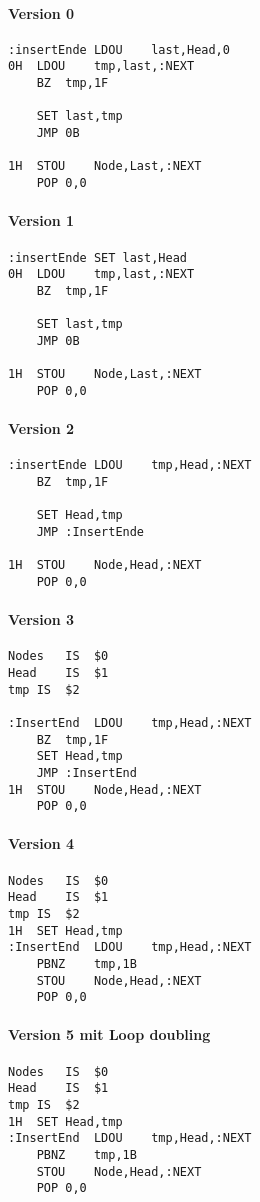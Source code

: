 \paragraph{Version 0}
\begin{lstlisting}
:insertEnde LDOU	last,Head,0
0H	LDOU	tmp,last,:NEXT
	BZ	tmp,1F
	
	SET	last,tmp
	JMP	0B
	
1H	STOU	Node,Last,:NEXT
	POP	0,0	
\end{lstlisting}

\paragraph{Version 1}
\begin{lstlisting}
:insertEnde SET	last,Head
0H	LDOU	tmp,last,:NEXT
	BZ	tmp,1F
	
	SET	last,tmp
	JMP	0B
	
1H	STOU	Node,Last,:NEXT
	POP	0,0	
\end{lstlisting}

\paragraph{Version 2}
\begin{lstlisting}
:insertEnde	LDOU	tmp,Head,:NEXT
	BZ	tmp,1F
	
	SET	Head,tmp
	JMP	:InsertEnde
	
1H	STOU	Node,Head,:NEXT
	POP	0,0	
\end{lstlisting}

\paragraph{Version 3}
\begin{lstlisting}
Nodes	IS	$0
Head	IS	$1
tmp	IS	$2

:InsertEnd	LDOU	tmp,Head,:NEXT
	BZ	tmp,1F
	SET	Head,tmp
	JMP	:InsertEnd
1H	STOU	Node,Head,:NEXT
	POP	0,0	
\end{lstlisting}

\paragraph{Version 4}
\begin{lstlisting}
Nodes	IS	$0
Head	IS	$1
tmp	IS	$2
1H	SET	Head,tmp
:InsertEnd	LDOU	tmp,Head,:NEXT
	PBNZ	tmp,1B
	STOU	Node,Head,:NEXT
	POP	0,0	
\end{lstlisting}

\paragraph{Version 5 mit Loop doubling}
\begin{lstlisting}
Nodes	IS	$0
Head	IS	$1
tmp	IS	$2
1H	SET	Head,tmp
:InsertEnd	LDOU	tmp,Head,:NEXT
	PBNZ	tmp,1B
	STOU	Node,Head,:NEXT
	POP	0,0	
\end{lstlisting}
